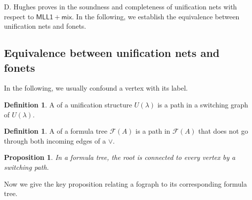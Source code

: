 \documentclass[conference,twosided,10pt]{IEEEtran}
\newtheorem{proposition}[thm]{Proposition}
\theoremstyle{definition}
\newtheorem{definition}[thm]{Definition}
\newcommand*{\FOMLLm}{\mathsf{MLL1+mix}}
\newcommand{\cor}{\vee}
\newcommand{\formtree}[1]{\mathcal{F}(#1)}
\begin{document}
D. Hughes proves in \cite{hughes:unifn} the soundness and completeness of
unification nets with respect to $\FOMLLm$. In the following, we establish the
equivalence between unification nets and fonets.

\subsection{Equivalence between unification nets and fonets}
In the following, we usually confound a vertex with its label. 

\begin{definition} A  of a unification structure $U(\lambda)$ is a path in a switching graph of $U(\lambda)$.
\end{definition}

\begin{definition} A  of a formula tree $\formtree{A}$ is a
	path in $\formtree{A}$ that does not go through both incoming edges of a $\cor$.
\end{definition}

\begin{proposition}
\label{prop1}
In a formula tree, the root is connected to every vertex by a switching path.
\end{proposition}

Now we give the key proposition relating a fograph to its corresponding formula
tree.
\end{document}
